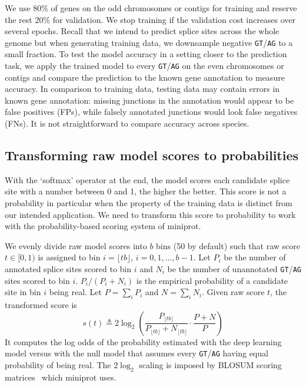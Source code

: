 \documentclass[webpdf,contemporary,large,namedate]{oup-authoring-template}%
\begin{document}
We use 80\% of genes on the odd chromosomes or contigs for training and reserve the rest 20\% for validation.
We stop training if the validation cost increases over several epochs.
Recall that we intend to predict splice sites across the whole genome
but when generating training data, we downsample negative {\tt GT}/{\tt AG} to a small fraction.
To test the model accuracy in a setting closer to the prediction task,
we apply the trained model to every {\tt GT}/{\tt AG} on the even chromosomes or contigs
and compare the prediction to the known gene annotation to measure accuracy.
In comparison to training data, testing data may contain errors in known gene annotation:
missing junctions in the annotation would appear to be false positives (FPs),
while falsely annotated junctions would look false negatives (FNs).
It is not straightforward to compare accuracy across species.

\subsection{Transforming raw model scores to probabilities}

With the `softmax' operator at the end,
the model scores each candidate splice site with a number between 0 and 1, the higher the better.
This score is not a probability in particular when the property of the training data
is distinct from our intended application.
We need to transform this score to probability to work with the probability-based scoring system of miniprot.

We evenly divide raw model scores into $b$ bins (50 by default) such that
raw score $t\in[0,1)$ is assigned to bin $i=\lfloor tb\rfloor$, $i=0,1,\ldots,b-1$.
Let $P_i$ be the number of annotated splice sites scored to bin $i$
and $N_i$ be the number of unannotated {\tt GT}/{\tt AG} sites scored to bin $i$.
$P_i/(P_i+N_i)$ is the empirical probability of a candidate site in bin $i$ being real.
Let $P=\sum_i P_i$ and $N=\sum_i N_i$.
Given raw score $t$, the transformed score is
\begin{equation}\label{eq:s}
s(t)\triangleq 2\log_2\left(\frac{P_{\lfloor tb\rfloor}}{P_{\lfloor tb\rfloor}+N_{\lfloor tb\rfloor}}\cdot\frac{P+N}{P}\right)
\end{equation}
It computes the log odds of the probability estimated with the deep learning model
versus with the null model that assumes every {\tt GT}/{\tt AG} having equal probability of being real.
The $2\log_2$ scaling is imposed by BLOSUM scoring matrices~\citep{Henikoff:1992tk} which miniprot uses.
\end{document}
